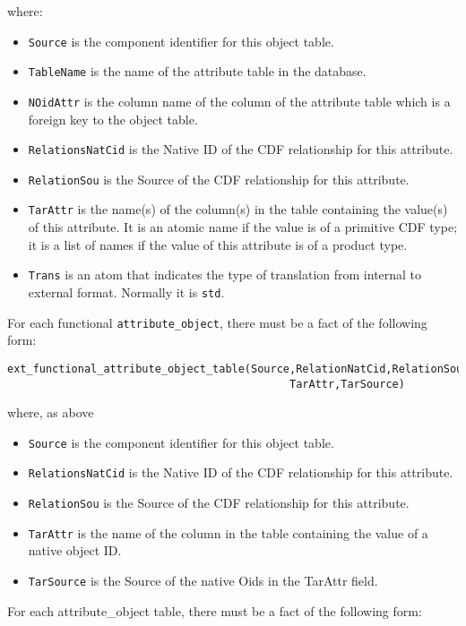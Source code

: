 where:
\begin{itemize}
\item
{\tt Source} is the component identifier for this object table.
\item
{\tt TableName} is the name of the attribute table in the database.
\item
{\tt NOidAttr} is the column name of the column of the attribute table which
  is a foreign key to the object table.
\item
{\tt RelationsNatCid} is the Native ID of the CDF relationship for this
  attribute.
\item
{\tt RelationSou} is the Source of the CDF relationship for this attribute.
\item
{\tt TarAttr} is the name(s) of the column(s) in the table containing the
value(s) of this attribute.  It is an atomic name if the value is of a
primitive CDF type; it is a list of names if the value of this
attribute is of a product type.
\item
{\tt Trans} is an atom that indicates the type of translation from
internal to external format.  Normally it is {\tt std}.
\end{itemize}

For each functional {\tt attribute\_object}, there must be a fact of the
following form:

\begin{verbatim}
ext_functional_attribute_object_table(Source,RelationNatCid,RelationSou,
                                            TarAttr,TarSource)
\end{verbatim}

where, as above

\begin{itemize}
\item
{\tt Source} is the component identifier for this object table.
\item
{\tt RelationsNatCid} is the Native ID of the CDF relationship for this
  attribute.
\item
{\tt RelationSou} is the Source of the CDF relationship for this attribute.
\item
{\tt TarAttr} is the name of the column in the table containing the value of
  a native object ID.
\item
{\tt TarSource} is the Source of the native Oids in the TarAttr field.
\end{itemize}

For each attribute\_object table, there must be a fact of the following form:

